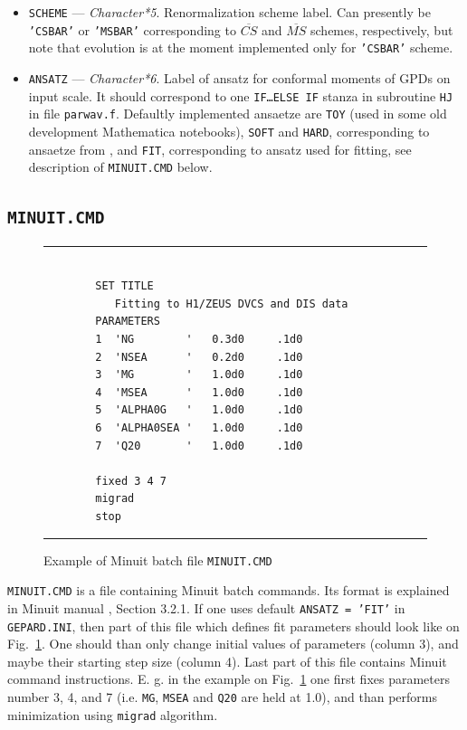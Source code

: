 \documentclass[12pt]{article}
\begin{document}
\begin{itemize}
\item
\texttt{SCHEME} --- \emph{Character*5}. Renormalization scheme label. Can presently be \texttt{'CSBAR'} or
\texttt{'MSBAR'} corresponding to $\overline{CS}$ and $\overline{MS}$ schemes, respectively,
but note that evolution is at the moment implemented only for \texttt{'CSBAR'} scheme.

\item
\texttt{ANSATZ} --- \emph{Character*6}. Label of ansatz for conformal moments of GPDs on input scale. 
It should correspond to one  \texttt{IF\ldots ELSE IF} stanza in subroutine
\texttt{HJ} in file \texttt{parwav.f}. Defaultly implemented ansaetze are
\texttt{TOY} (used in some old development Mathematica notebooks), \texttt{SOFT} and \texttt{HARD},
corresponding to ansaetze from \cite{Kumericki:2006xx}, and \texttt{FIT}, corresponding
to ansatz used for fitting, see description of \texttt{MINUIT.CMD} below.

\end{itemize}

\subsection{\texttt{MINUIT.CMD}}

\begin{figure}[t]
\begin{center}
\hrule
\begin{verbatim}

        SET TITLE
           Fitting to H1/ZEUS DVCS and DIS data
        PARAMETERS
        1  'NG        '   0.3d0     .1d0
        2  'NSEA      '   0.2d0     .1d0
        3  'MG        '   1.0d0     .1d0 
        4  'MSEA      '   1.0d0     .1d0
        5  'ALPHA0G   '   1.0d0     .1d0
        6  'ALPHA0SEA '   1.0d0     .1d0
        7  'Q20       '   1.0d0     .1d0

        fixed 3 4 7
        migrad
        stop

\end{verbatim}
\hrule
\end{center}
\caption{Example of Minuit batch file \texttt{MINUIT.CMD}}
\label{fig:MINUIT.CMD}
\end{figure}

\texttt{MINUIT.CMD} is a file containing Minuit batch commands. Its format is explained in
Minuit manual \cite{Minuit}, Section 3.2.1.  If one uses default \texttt{ANSATZ = 'FIT'} in
\texttt{GEPARD.INI}, then part of this file which defines fit parameters should look like on
Fig.~\ref{fig:MINUIT.CMD}. One should than only change initial values of parameters
(column 3), and maybe their starting step size (column 4). Last part of this file
contains Minuit command instructions. E. g. in the example on Fig.~\ref{fig:MINUIT.CMD}
one first fixes parameters number 3, 4, and 7 (i.e. \texttt{MG}, \texttt{MSEA} and \texttt{Q20}
are held at 1.0), and than performs minimization using \texttt{migrad} algorithm.
\end{document}
